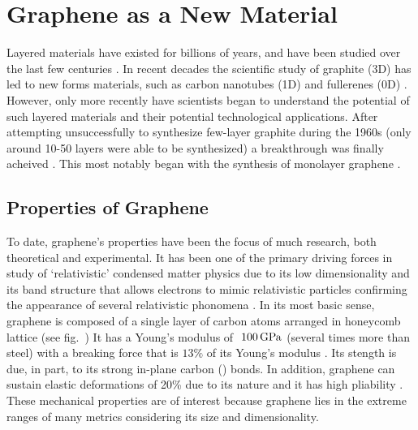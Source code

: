 \section{Graphene as a New \Td Material}\label{sec:graphene}
Layered materials have existed for billions of years, and have been studied over the last few centuries \cite{Golden_EarthSci2013,Brodie_Royal1859}. In recent decades the scientific study of graphite (3D) has led to new forms materials, such as carbon nanotubes (1D) and fullerenes (0D) \cite{Kroto_Nature1985, Balleste_Nanoscale2011,Iijima_Nature1991}. However, only more recently have scientists began to understand the potential of such layered materials and their potential technological applications. After attempting unsuccessfully to synthesize few-layer graphite during the 1960s (only around 10-50 layers were able to be synthesized) a breakthrough was finally acheived \cite{Balleste_Nanoscale2011}. This most notably began with the synthesis of monolayer graphene \cite{Novoselov_Science2004}.

\subsection{Properties of Graphene}\label{subsec:graphene_properties}
To date, graphene's properties have been the focus of much research, both theoretical and experimental. It has been one of the primary driving forces in study of `relativistic' condensed matter physics due to its low dimensionality and its band structure that allows electrons to mimic relativistic particles confirming the appearance of several relativistic phonomena \cite{Geim_NatureMat2007,Geim_Nature2005,Zhang_NatPhys2011,Williams_Science2007}. In its most basic sense, graphene is composed of a single layer of carbon atoms arranged in \td honeycomb lattice (see fig.~) It has a Young's modulus of $~100\,\mathrm{GPa}$ (several times more than steel) with a breaking force that is $13\%$ of its Young's modulus \cite{Bertolazzi_ACSnano2011, Akinwande_NatureComm2014}. Its stength is due, in part, to its strong in-plane carbon () bonds. In addition, graphene can sustain elastic deformations of 20\% due to its \td nature and it has high pliability \cite{Balleste_Nanoscale2011}. These mechanical properties are of interest because graphene lies in the extreme ranges of many metrics considering its size and dimensionality.\\

